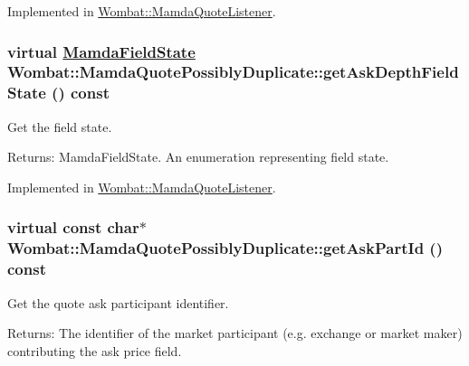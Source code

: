 Implemented in \hyperlink{classWombat_1_1MamdaQuoteListener_4bc38582299115bc9d45411e4fabc76d}{Wombat::Mamda\-Quote\-Listener}.\hypertarget{classWombat_1_1MamdaQuotePossiblyDuplicate_150377938a68d1e2e86eb46e8e415207}{
\subsubsection[getAskDepthFieldState]{\setlength{\rightskip}{0pt plus 5cm}virtual \hyperlink{namespaceWombat_93aac974f2ab713554fd12a1fa3b7d2a}{Mamda\-Field\-State} Wombat::Mamda\-Quote\-Possibly\-Duplicate::get\-Ask\-Depth\-Field\-State () const}}
\label{classWombat_1_1MamdaQuotePossiblyDuplicate_150377938a68d1e2e86eb46e8e415207}


Get the field state. 

\begin{Desc}
\item[Returns:]Mamda\-Field\-State. An enumeration representing field state. \end{Desc}


Implemented in \hyperlink{classWombat_1_1MamdaQuoteListener_f43a394a5e090162a80b749f682ecc38}{Wombat::Mamda\-Quote\-Listener}.\hypertarget{classWombat_1_1MamdaQuotePossiblyDuplicate_861181f08a7174f5b2d953a1360a02b7}{
\subsubsection[getAskPartId]{\setlength{\rightskip}{0pt plus 5cm}virtual const char$\ast$ Wombat::Mamda\-Quote\-Possibly\-Duplicate::get\-Ask\-Part\-Id () const}}
\label{classWombat_1_1MamdaQuotePossiblyDuplicate_861181f08a7174f5b2d953a1360a02b7}


Get the quote ask participant identifier. 

\begin{Desc}
\item[Returns:]The identifier of the market participant (e.g. exchange or market maker) contributing the ask price field. \end{Desc}


